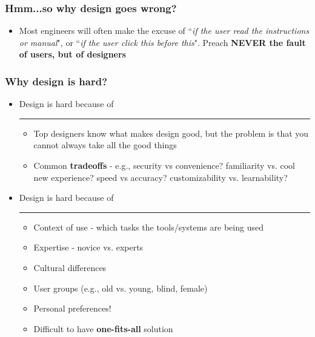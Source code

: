\documentclass{beamer}
\begin{document}
\begin{frame}
\frametitle{Hmm...so why design goes wrong?}
\begin{itemize}
	\item Most engineers will often make the excuse of ``\textit{if the user read the instructions or manual}", or ``\textit{if the user click this before this}".  Preach \textbf{NEVER the fault of users, but of designers}
\end{itemize}
\end{frame}


\begin{frame}
\frametitle{Why design is hard?}
\begin{itemize}
	\item Design is hard because of \rule{2cm}{0.15mm}
	\begin{itemize}
		\item Top designers know what makes design good, but the problem is that you cannot always take all the good things
		\item Common \textbf{tradeoffs} - e.g., security vs convenience? familiarity vs. cool new experience? speed vs accuracy? customizability vs. learnability?
	\end{itemize}
	\item Design is hard because of \rule{2cm}{0.15mm}
	\begin{itemize}
		\item Context of use - which tasks the tools/systems are being used
		\item Expertise - novice vs. experts
		\item Cultural differences
		\item User groups (e.g., old vs. young, blind, female)
		\item Personal preferences!  
		\item Difficult to have \textbf{one-fits-all} solution
	\end{itemize}
\end{itemize}
\end{frame}
\end{document}
